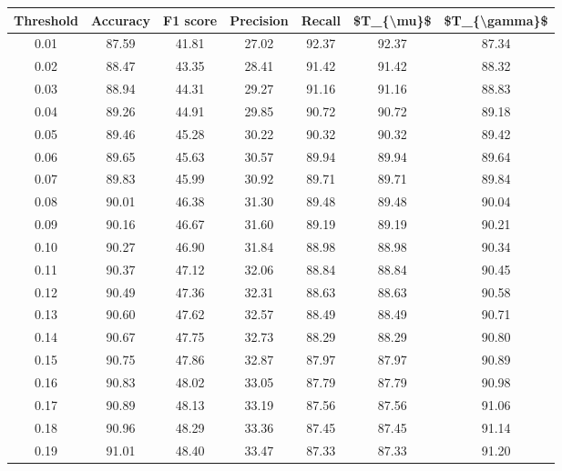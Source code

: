 \begin{tabular}{|c|c|c|c|c|c|c|}
\hline
 Threshold &  Accuracy &  F1 score &  Precision &  Recall &  \$T\_\{\textbackslash mu\}\$ &  \$T\_\{\textbackslash gamma\}\$ \\
\hline
      0.01 &     87.59 &     41.81 &      27.02 &   92.37 &      92.37 &         87.34 \\
      0.02 &     88.47 &     43.35 &      28.41 &   91.42 &      91.42 &         88.32 \\
      0.03 &     88.94 &     44.31 &      29.27 &   91.16 &      91.16 &         88.83 \\
      0.04 &     89.26 &     44.91 &      29.85 &   90.72 &      90.72 &         89.18 \\
      0.05 &     89.46 &     45.28 &      30.22 &   90.32 &      90.32 &         89.42 \\
      0.06 &     89.65 &     45.63 &      30.57 &   89.94 &      89.94 &         89.64 \\
      0.07 &     89.83 &     45.99 &      30.92 &   89.71 &      89.71 &         89.84 \\
      0.08 &     90.01 &     46.38 &      31.30 &   89.48 &      89.48 &         90.04 \\
      0.09 &     90.16 &     46.67 &      31.60 &   89.19 &      89.19 &         90.21 \\
      0.10 &     90.27 &     46.90 &      31.84 &   88.98 &      88.98 &         90.34 \\
      0.11 &     90.37 &     47.12 &      32.06 &   88.84 &      88.84 &         90.45 \\
      0.12 &     90.49 &     47.36 &      32.31 &   88.63 &      88.63 &         90.58 \\
      0.13 &     90.60 &     47.62 &      32.57 &   88.49 &      88.49 &         90.71 \\
      0.14 &     90.67 &     47.75 &      32.73 &   88.29 &      88.29 &         90.80 \\
      0.15 &     90.75 &     47.86 &      32.87 &   87.97 &      87.97 &         90.89 \\
      0.16 &     90.83 &     48.02 &      33.05 &   87.79 &      87.79 &         90.98 \\
      0.17 &     90.89 &     48.13 &      33.19 &   87.56 &      87.56 &         91.06 \\
      0.18 &     90.96 &     48.29 &      33.36 &   87.45 &      87.45 &         91.14 \\
      0.19 &     91.01 &     48.40 &      33.47 &   87.33 &      87.33 &         91.20 \\

\end{tabular}
